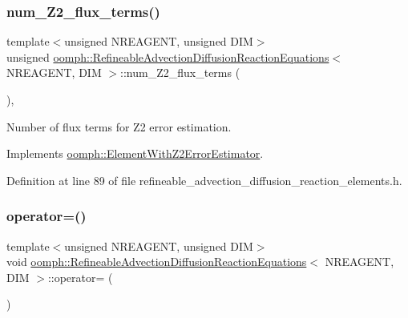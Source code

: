 \subsubsection{\texorpdfstring{num\+\_\+\+Z2\+\_\+flux\+\_\+terms()}{num\_Z2\_flux\_terms()}}
{\footnotesize\ttfamily template$<$unsigned N\+R\+E\+A\+G\+E\+NT, unsigned D\+IM$>$ \\
unsigned \hyperlink{classoomph_1_1RefineableAdvectionDiffusionReactionEquations}{oomph\+::\+Refineable\+Advection\+Diffusion\+Reaction\+Equations}$<$ N\+R\+E\+A\+G\+E\+NT, D\+IM $>$\+::num\+\_\+\+Z2\+\_\+flux\+\_\+terms (\begin{DoxyParamCaption}{ }\end{DoxyParamCaption})\hspace{0.3cm}{\ttfamily [inline]}, {\ttfamily [virtual]}}



Number of \textquotesingle{}flux\textquotesingle{} terms for Z2 error estimation. 



Implements \hyperlink{classoomph_1_1ElementWithZ2ErrorEstimator_ae82c5728902e13da31be19c390fc28e3}{oomph\+::\+Element\+With\+Z2\+Error\+Estimator}.



Definition at line 89 of file refineable\+\_\+advection\+\_\+diffusion\+\_\+reaction\+\_\+elements.\+h.

\mbox{\label{classoomph_1_1RefineableAdvectionDiffusionReactionEquations_a437e94eef9468acb33991bcb545ac175}} 
\subsubsection{\texorpdfstring{operator=()}{operator=()}}
{\footnotesize\ttfamily template$<$unsigned N\+R\+E\+A\+G\+E\+NT, unsigned D\+IM$>$ \\
void \hyperlink{classoomph_1_1RefineableAdvectionDiffusionReactionEquations}{oomph\+::\+Refineable\+Advection\+Diffusion\+Reaction\+Equations}$<$ N\+R\+E\+A\+G\+E\+NT, D\+IM $>$\+::operator= (\begin{DoxyParamCaption}\item[{const \hyperlink{classoomph_1_1RefineableAdvectionDiffusionReactionEquations}{Refineable\+Advection\+Diffusion\+Reaction\+Equations}$<$ N\+R\+E\+A\+G\+E\+NT, D\+IM $>$ \&}]{ }\end{DoxyParamCaption})\hspace{0.3cm}{\ttfamily [inline]}}




